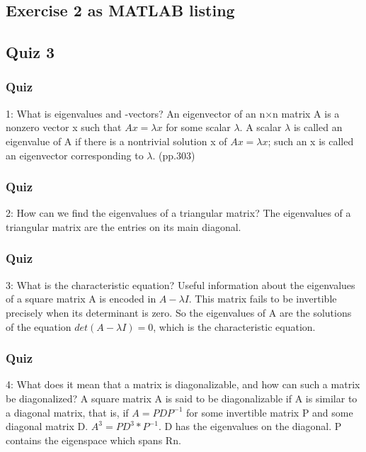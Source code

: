 \subsection{Exercise 2 as MATLAB listing}
\label{sec:Exercise 2 as MATLAB listing}


\subsection{Quiz 3}
\label{sec:Quiz_3}

\subsubsection{Quiz} 1: What is eigenvalues and -vectors?
        An eigenvector of an n×n matrix A is a nonzero vector x such that $Ax = \lambda x$ for some scalar $\lambda$. 
        A scalar $\lambda$ is called an eigenvalue of A if there is a nontrivial solution x of $Ax = \lambda x$; 
        such an x is called an eigenvector corresponding to $\lambda$. (pp.303)

\subsubsection{Quiz} 2: How can we find the eigenvalues of a triangular matrix?
        The eigenvalues of a triangular matrix are the entries on its main diagonal.

\subsubsection{Quiz} 3: What is the characteristic equation?
        Useful information about the eigenvalues of a square matrix A is encoded in $A-\lambda I$. 
        This matrix fails to be invertible precisely when its determinant is zero. 
        So the eigenvalues of A are the solutions of the equation $det(A-\lambda I)=0$, 
        which is the characteristic equation.

\subsubsection{Quiz} 4: What does it mean that a matrix is diagonalizable, and how can such a matrix be diagonalized?
        A square matrix A is said to be diagonalizable if A is similar to a diagonal matrix, that is, 
        if $A = PDP^{-1}$ for some invertible matrix P and some diagonal matrix D.
        $A^3 = P  D^3 * P^{-1}$. D has the eigenvalues on the diagonal. P contains the eigenspace which spans Rn.


